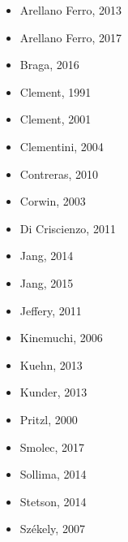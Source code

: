 \documentclass[]{article}
\begin{document}
\begin{itemize}
	\item Arellano Ferro, 2013 \cite{arellano_ferro_2013}
	\item Arellano Ferro, 2017 \cite{arellano_ferro_2017}
	\item Braga, 2016 \cite{braga_2016}
	\item Clement, 1991 \cite{clement_1991_a}
	\item Clement, 2001 \cite{clement_2001_a}
	\item Clementini, 2004 \cite{clementini_2004}
	\item Contreras, 2010 \cite{contreras_2010}
	\item Corwin, 2003 \cite{corwin_2003}
	\item Di Criscienzo, 2011 \cite{di_criscienzo_2011_a}
	\item Jang, 2014 \cite{jang_2014}
	\item Jang, 2015 \cite{jang_2015}
	\item Jeffery, 2011 \cite{jeffery_2011}
	\item Kinemuchi, 2006 \cite{kinemuchi_2006_a}
	\item Kuehn, 2013 \cite{kuehn_2013}
	\item Kunder, 2013 \cite{kunder_2013_d}
	\item Pritzl, 2000 \cite{pritzl_2000_a}
	\item Smolec, 2017 \cite{smolec_2017}
	\item Sollima, 2014 \cite{sollima_2014}
	\item Stetson, 2014 \cite{stetson_2014}
	\item Székely, 2007 \cite{szekely_2007}
\end{itemize}

\newpage
\end{document}
